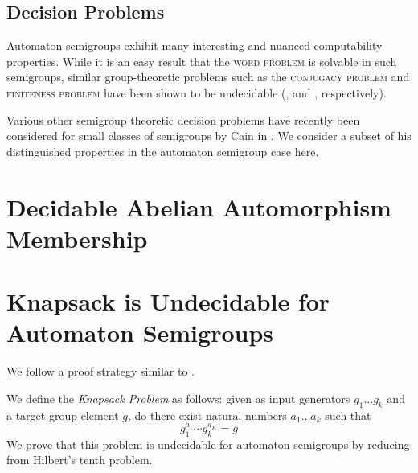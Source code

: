 \documentclass[10pt]{article}
\newcommand{\defn}[1]{\textit{#1}}
\newcommand{\decprob}[1]{\textsc{#1}}
\begin{document}

\subsection*{Decision Problems}
Automaton semigroups exhibit many interesting and nuanced
computability properties. While it is an easy result that the
\decprob{word problem} is solvable in such semigroups, similar
group-theoretic problems such as the \decprob{conjugacy problem} and
\decprob{finiteness problem} have been shown to be undecidable
(\cite{sunic:conj}, and \cite{gillibert:finite}, respectively).

Various other semigroup theoretic decision problems have recently been
considered for small classes of semigroups by Cain in
\cite{Cain09:dec_prob}. We consider a subset of his distinguished
properties in the automaton semigroup case here.


\section{Decidable Abelian Automorphism Membership}

%

\section{Knapsack is Undecidable for Automaton Semigroups}
We follow a proof strategy similar to \cite{Konig15:knapsack}.

We define the \defn{Knapsack Problem} as follows: given as input
generators $g_1 \ldots g_k$ and a target group element $g$, do there
exist natural numbers $a_1\ldots a_k$ such that
\[ g_1^{a_1} \cdots g_k^{a_K} = g \] We prove that this problem is
undecidable for automaton semigroups by reducing from %
Hilbert's tenth problem.
\end{document}
